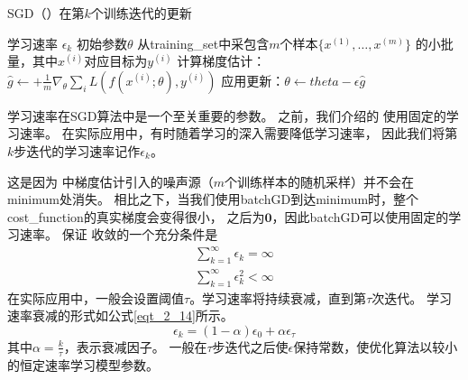 \begin{algorithm}[ht]
	\caption{\gls{SGD}（）在第$k$个训练迭代的更新}
	\label{alg:sgd}
	\begin{algorithmic}
		\REQUIRE 学习速率 $\epsilon_k$
		\REQUIRE 初始参数$\theta$
		\STATE 从\gls{training_set}中采包含$m$个样本$\{ x^{(1)},\dots, x^{(m)}\}$ 的小批量，其中$x^{(i)}$对应目标为$y^{(i)}$
		\STATE 计算梯度估计： $\hat{g} \leftarrow + 
		\frac{1}{m} \nabla_{\theta} \sum_i L(f(x^{(i)};\theta),y^{(i)})$
		\STATE 应用更新：$\theta \leftarrow theta - \epsilon \hat{g}$
		\ENDWHILE
	\end{algorithmic}
\end{algorithm}

学习速率在SGD算法中是一个至关重要的参数。
之前，我们介绍的\,\,使用固定的学习速率。
在实际应用中，有时随着学习的深入需要降低学习速率，
因此我们将第$k$步迭代的学习速率记作$\epsilon_k$。

这是因为\,\,中梯度估计引入的噪声源（$m$个训练样本的随机采样）并不会在\gls{minimum}处消失。
相比之下，当我们使用\gls{batch}\gls{GD}到达\gls{minimum}时，整个\gls{cost_function}的真实梯度会变得很小，
之后为$\mathbf{0}$，因此\gls{batch}\gls{GD}可以使用固定的学习速率。
保证\,\,收敛的一个充分条件是
\begin{equation}
\label{eq:8.12}
	\begin{aligned}
		\sum_{k=1}^\infty \epsilon_k = \infty\\
		\sum_{k=1}^\infty \epsilon_k^2 < \infty
	\end{aligned}
\end{equation}
在实际应用中，一般会设置阈值$\tau$。学习速率将持续衰减，直到第$\tau$次迭代。
学习速率衰减的形式如公式\eqref{eqt_2_14}所示。
\begin{equation}
\label{eqt_2_14}
\epsilon_k = (1-\alpha) \epsilon_0 + \alpha \epsilon_\tau
\end{equation}
其中$\alpha = \frac{k}{\tau}$，表示衰减因子。
一般在$\tau$步迭代之后使$\epsilon$保持常数，使优化算法以较小的恒定速率学习模型参数。


